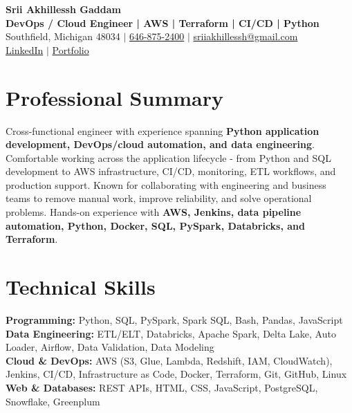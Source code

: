 \documentclass[letterpaper,10pt]{article}
\begin{document}
\fontsize{9.35pt}{10.45pt}\selectfont

\begin{center}
    {\LARGE \textbf{Srii Akhillessh Gaddam}} \\[-1pt]
    \textbf{DevOps / Cloud Engineer | AWS | Terraform | CI/CD | Python} \\[2pt]
    Southfield, Michigan 48034 $|$
    \href{tel:6468752400}{646-875-2400} $|$
    \href{mailto:sriiakhillessh@gmail.com}{sriiakhillessh@gmail.com} \\[1pt]
    \href{https://www.linkedin.com/in/srii-akhiilessh-gaddam-b48668191/}{LinkedIn} $|$
    \href{https://sriiakhillesshg.github.io/portfolio/}{Portfolio}
\end{center}
\vspace{-8pt}

\section{Professional Summary}
\small{Cross-functional engineer with experience spanning \textbf{Python application development, DevOps/cloud automation, and data engineering}. Comfortable working across the application lifecycle - from Python and SQL development to AWS infrastructure, CI/CD, monitoring, ETL workflows, and production support. Known for collaborating with engineering and business teams to remove manual work, improve reliability, and solve operational problems. Hands-on experience with \textbf{AWS, Jenkins, data pipeline automation, Python, Docker, SQL, PySpark, Databricks, and Terraform}.}

\section{Technical Skills}
\small{
\textbf{Programming:} Python, SQL, PySpark, Spark SQL, Bash, Pandas, JavaScript \\
\textbf{Data Engineering:} ETL/ELT, Databricks, Apache Spark, Delta Lake, Auto Loader, Airflow, Data Validation, Data Modeling \\
\textbf{Cloud \& DevOps:} AWS (S3, Glue, Lambda, Redshift, IAM, CloudWatch), Jenkins, CI/CD, Infrastructure as Code, Docker, Terraform, Git, GitHub, Linux \\
\textbf{Web \& Databases:} REST APIs, HTML, CSS, JavaScript, PostgreSQL, Snowflake, Greenplum
}
\end{document}
